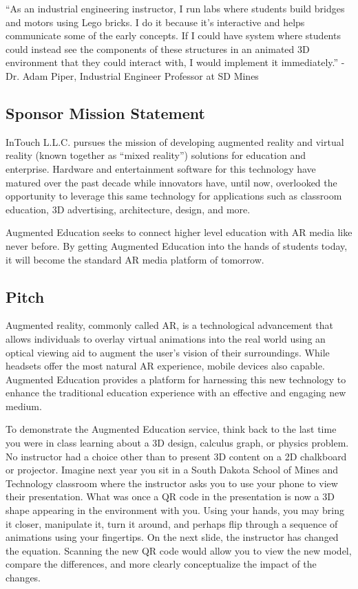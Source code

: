 “As an industrial engineering instructor, I run labs where students build bridges and motors using Lego bricks. I do it because it's interactive and helps communicate some of the early concepts. If I could  have system where students could instead see the components of these structures in an animated 3D environment that they could interact with, I would implement it immediately.” - Dr. Adam Piper, Industrial Engineer Professor at SD Mines



\subsection{Sponsor Mission Statement}
InTouch L.L.C. pursues the mission of developing augmented reality and virtual reality (known together as “mixed reality”) solutions for education and enterprise. Hardware and entertainment software for this technology have matured over the past decade while innovators have, until now, overlooked the opportunity to leverage this same technology for applications such as classroom education, 3D advertising, architecture, design, and more.  

Augmented Education seeks to connect higher level education with AR media like never before. By getting Augmented Education into the hands of students today, it will become the standard AR media platform of tomorrow. 

\subsection{Pitch}
Augmented reality, commonly called AR, is a technological advancement that allows individuals to overlay virtual animations into the real world using an optical viewing aid to augment the user’s vision of their surroundings. While headsets offer the most natural AR experience, mobile devices also capable. Augmented Education provides a platform for harnessing this new technology to enhance the traditional education experience with an effective and engaging new medium. 

To demonstrate the Augmented Education service, think back to the last time you were in class learning about a 3D design, calculus graph, or physics problem. No instructor had a choice other than to present 3D content on a 2D chalkboard or projector. Imagine next year you sit in  a South Dakota School of Mines and Technology classroom where the instructor asks you to use your phone to view their presentation. What was once a QR code in the presentation is now a 3D shape appearing in the environment with you. Using your hands, you may bring it closer, manipulate it, turn it around, and perhaps flip through a sequence of animations using your fingertips. On the next slide, the instructor has changed the equation. Scanning the new QR code would allow you to view the new model, compare the differences, and more clearly conceptualize the impact of the changes.

